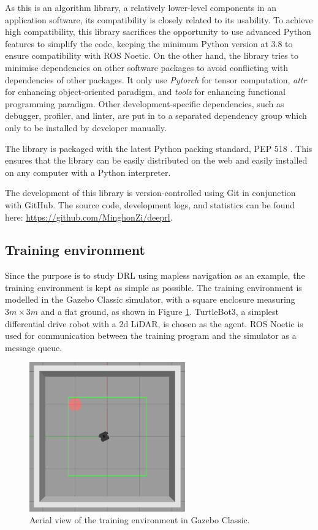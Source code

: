 As this is an algorithm library, a relatively lower-level components in an application software, its compatibility is closely related to its usability. To achieve high compatibility, this library sacrifices the opportunity to use advanced Python features to simplify the code, keeping the minimum Python version at 3.8 to ensure compatibility with ROS Noetic. On the other hand, the library tries to minimise dependencies on other software packages to avoid conflicting with dependencies of other packages. It only use \textit{Pytorch} for tensor computation, \textit{attr} for enhancing object-oriented paradigm, and \textit{toolz} for enhancing functional programming paradigm. Other development-specific dependencies, such as debugger, profiler, and linter, are put in to a separated dependency group which only to be installed by developer manually.

The library is packaged with the latest Python packing standard, PEP 518 \cite{ref:pep518}. This ensures that the library can be easily distributed on the web and easily installed on any computer with a Python interpreter.

The development of this library is version-controlled using Git in conjunction with GitHub. The source code, development logs, and statistics can be found here: \url{https://github.com/MinghonZi/deeprl}.

\subsection{Training environment}

Since the purpose is to study DRL using mapless navigation as an example, the training environment is kept as simple as possible. The training environment is modelled in the Gazebo Classic simulator, with a square enclosure measuring $3m \times 3m$ and a flat ground, as shown in Figure \ref{fig:birdview}. TurtleBot3, a simplest differential drive robot with a 2d LiDAR, is chosen as the agent. ROS Noetic is used for communication between the training program and the simulator as a message queue.

\begin{figure}[htbp]
   \centering
   \includegraphics[width=0.6\textwidth]{images/birdview-of-env.png}
   \caption{Aerial view of the training environment in Gazebo Classic.}
   \label{fig:birdview}
\end{figure}

